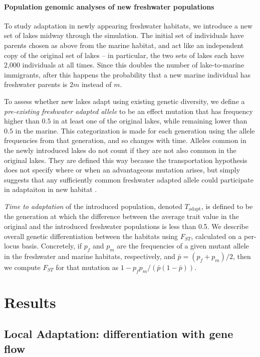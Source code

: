 \documentclass{article}
\begin{document}
\paragraph{Population genomic analyses of new freshwater populations} To study adaptation in newly appearing freshwater habitats, we introduce a new set of lakes midway through the simulation. The initial set of individuals have parents chosen as above from the marine habitat, and act like an independent copy of the original set of lakes -- in particular, the two sets of lakes each have 2,000 individuals at all times. Since this doubles the number of lake-to-marine immigrants, after this happens the probability that a new marine individual has freshwater parents is $2m$ instead of $m$.

To assess whether new lakes adapt using existing genetic diversity, we define a \emph{pre-existing freshwater adapted allele}
to be an effect mutation that has frequency higher than $0.5$ in at least one of the original lakes, while remaining lower than $0.5$ in the marine. This categorization is made for each generation using the allele frequencies from that generation, and so changes with time. Alleles common in the newly introduced lakes do not count
if they are not also common in the original lakes. They are defined this way because the transportation hypothesis does not specify where or when an advantageous mutation arises, but simply suggests that any sufficiently common freshwater adapted allele could participate in adaptaiton in new habitat \citep{schluter2009genetics}.

\emph{Time to adaptation} of the introduced population, denoted $T_\text{adapt}$, is defined to be the generation at which the difference between the average trait value in the original and the introduced freshwater populations is less than 0.5. We describe overall genetic differentiation between the habitats using $F_{ST}$,
calculated on a per-locus basis. Concretely, if $p_f$ and $p_m$ are the frequencies of a given mutant allele in the freshwater and marine habitats, respectively,
and $\bar p = (p_f + p_m)/2$, then we compute $F_{ST}$ for that mutation as $1 - p_f p_m / (\bar p (1-\bar p))$.


\section{Results}

\subsection*{Local Adaptation: differentiation with gene flow}
\end{document}
